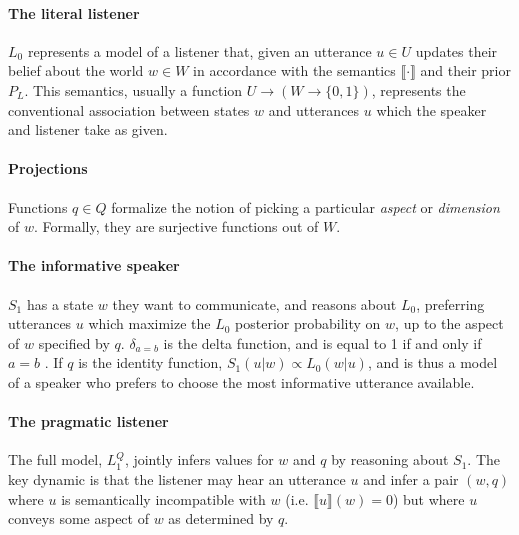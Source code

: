 \documentclass[9pt,twocolumn,twoside,lineno]{pnas-new}
\newcommand{\Listener}{L}
\newcommand{\QLONE}{\Listener_{{1}}^{{Q}}}
\begin{document}
	\paragraph{The literal listener} $L_0$ represents a model of a listener that, given an utterance $u\in U$ updates their belief about the world $w\in W$ in accordance with the semantics $\llbracket\cdot\rrbracket$ and their prior $P_L$. This semantics, usually a function $U\to(W\to\{0, 1\})$, represents the conventional association between states $w$ and utterances $u$ which the speaker and listener take as given. 


	\paragraph{Projections} 
	Functions $q\in Q$ formalize the notion of picking a particular \emph{aspect} or \emph{dimension} of $w$. Formally, they are surjective functions out of $W$.
	

	\paragraph{The informative speaker} $S_1$ has a state $w$ they want to communicate, and reasons about $L_0$, preferring utterances $u$ which maximize the $L_0$ posterior probability on $w$, up to the aspect of $w$ specified by $q$. $\delta_{a=b}$ is the delta function, and is equal to 1 if and only if $a=b$ . If $q$ is the identity function, $S_1(u|w) \propto L_0(w|u)$, and is thus a model of a speaker who prefers to choose the most informative utterance available. 
	
	\paragraph{The pragmatic listener} The full model, $\QLONE$, jointly infers values for $w$ and $q$ by reasoning about $S_1$. The key dynamic is that the listener may hear an utterance $u$ and infer a pair $(w,q)$ where $u$ is semantically incompatible with $w$ (i.e. $\llbracket u\rrbracket(w)=0$) but where $u$ conveys some aspect of $w$ as determined by $q$. 
\end{document}
